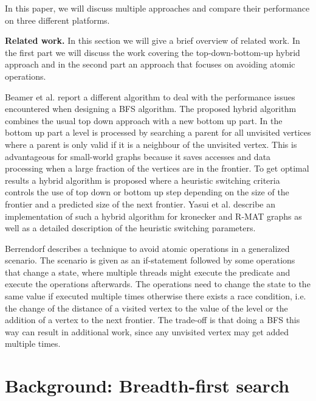 \documentclass[letterpaper]{article}
\newcommand{\mypar}[1]{{\bf #1.}}
\begin{document}
In this paper, we will discuss multiple approaches and compare their performance on three different platforms.


\mypar{Related work} 
In this section we will give a brief overview of related work. In the first part we will discuss the work covering the top-down-bottom-up hybrid approach and in the second part an approach that focuses on avoiding atomic operations.

Beamer et al.\cite{beamer2011searching} report a different algorithm to deal with the performance issues encountered when designing a BFS algorithm. The proposed hybrid algorithm combines the usual top down approach with a new bottom up part. In the bottom up part a level is processed by searching a parent for all unvisited vertices where a parent is only valid if it is a neighbour of the unvisited vertex. This is advantageous for small-world graphs because it saves accesses and data processing when a large fraction of the vertices are in the frontier. To get optimal results a hybrid algorithm is proposed where a heuristic switching criteria controls the use of top down or bottom up step depending on the size of the frontier and a predicted size of the next frontier. Yasui et al.\cite{6691600} describe an implementation of such a hybrid algorithm for kronecker and R-MAT graphs as well as a detailed description of the heuristic switching parameters.


Berrendorf\cite{Berrendorf:14} describes a technique to avoid atomic operations in a generalized scenario. The scenario is given as an if-statement followed by some operations that change a state, where multiple threads might execute the predicate and execute the operations afterwards. The operations need to change the state to the same value if executed multiple times otherwise there exists a race condition, i.e. the change of the distance of a visited vertex to the value of the level or the addition of a vertex to the next frontier. The trade-off is that doing a BFS this way can result in additional work, since any unvisited vertex may get added multiple times.


\section{Background: Breadth-first search}\label{sec:background}
\end{document}
